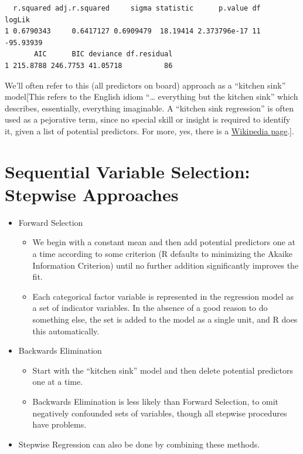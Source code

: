 \documentclass[]{book}
\providecommand{\tightlist}{%
  \setlength{\itemsep}{0pt}\setlength{\parskip}{0pt}}
\theoremstyle{definition}
\theoremstyle{definition}
\theoremstyle{definition}
\theoremstyle{remark}
\begin{document}
\begin{verbatim}
  r.squared adj.r.squared     sigma statistic      p.value df    logLik
1 0.6790343     0.6417127 0.6909479  18.19414 2.373796e-17 11 -95.93939
       AIC      BIC deviance df.residual
1 215.8788 246.7753 41.05718          86
\end{verbatim}

We'll often refer to this (all predictors on board) approach as a
``kitchen sink'' model{[}This refers to the English idiom ``\ldots{}
everything but the kitchen sink'' which describes, essentially,
everything imaginable. A ``kitchen sink regression'' is often used as a
pejorative term, since no special skill or insight is required to
identify it, given a list of potential predictors. For more, yes, there
is a
\href{https://en.wikipedia.org/wiki/Kitchen_sink_regression}{Wikipedia
page}.{]}.

\section{Sequential Variable Selection: Stepwise
Approaches}\label{sequential-variable-selection-stepwise-approaches}

\begin{itemize}
\tightlist
\item
  Forward Selection

  \begin{itemize}
  \tightlist
  \item
    We begin with a constant mean and then add potential predictors one
    at a time according to some criterion (R defaults to minimizing the
    Akaike Information Criterion) until no further addition
    significantly improves the fit.
  \item
    Each categorical factor variable is represented in the regression
    model as a set of indicator variables. In the absence of a good
    reason to do something else, the set is added to the model as a
    single unit, and R does this automatically.
  \end{itemize}
\item
  Backwards Elimination

  \begin{itemize}
  \tightlist
  \item
    Start with the ``kitchen sink'' model and then delete potential
    predictors one at a time.
  \item
    Backwards Elimination is less likely than Forward Selection, to omit
    negatively confounded sets of variables, though all stepwise
    procedures have problems.
  \end{itemize}
\item
  Stepwise Regression can also be done by combining these methods.
\end{itemize}
\end{document}

